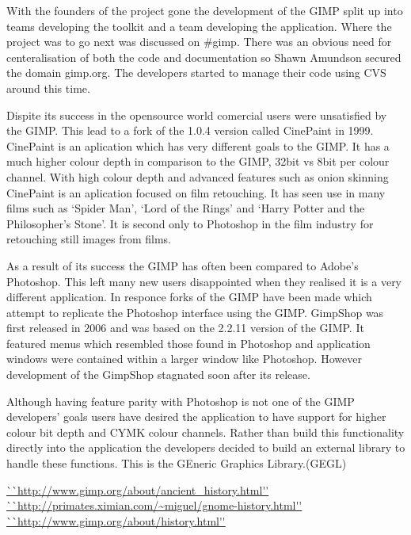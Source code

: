 \documentclass[a4 paper, 12pt]{article}
\begin{document}
	With the founders of the project gone the development of the GIMP split up
	into teams developing the toolkit and a team developing the application.
	Where the project was to go next was discussed on #gimp. There was an
	obvious need for centeralisation of both the code and documentation so Shawn
	Amundson secured the domain gimp.org. The developers started to manage their
	code using CVS around this time.

	Dispite its success in the opensource world comercial users were unsatisfied
	by the GIMP. This lead to a fork of the 1.0.4 version called CinePaint in
	1999.\cite{release} CinePaint is an aplication which has very different
	goals to the GIMP. It has a much higher colour depth in comparison to the
	GIMP, 32bit vs 8bit per colour channel. With high colour depth and advanced
	features such as onion skinning CinePaint is an aplication focused on film
	retouching. It has seen use in many films such as `Spider Man', `Lord of the
	Rings' and `Harry Potter and the Philosopher's Stone'. It is second only to
	Photoshop in the film industry for retouching still images from films.
	
	As a result of its success the GIMP has often been compared to Adobe's
	Photoshop. This left many new users disappointed when they realised it is a
	very different application. In responce forks of the GIMP have been made
	which attempt to replicate the Photoshop interface using the GIMP. GimpShop
	was first released in 2006 and was based on the 2.2.11 version of the GIMP.
	It featured menus which resembled those found in Photoshop and application
	windows were contained within a larger window like Photoshop. However
	development of the GimpShop stagnated soon after its release.

	Although having feature parity with Photoshop is not one of the GIMP
	developers' goals users have desired the application to have support for
	higher colour bit depth and CYMK colour channels. Rather than build this
	functionality directly into the application the developers decided to build
	an external library to handle these functions. This is the GEneric Graphics
	Library.(GEGL)
\begin{thebibliography}{12}
		\url{``http://www.gimp.org/about/ancient_history.html''}
		\url{``http://primates.ximian.com/~miguel/gnome-history.html''}
		\url{``http://www.gimp.org/about/history.html''}
\end{thebibliography}
\end{document}
